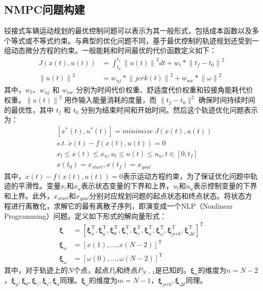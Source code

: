 \documentclass[master,academic]{ysuthesis} %
\begin{document}
		\subsection{NMPC问题构建}
		铰接式车辆运动规划的最优控制问题可以表示为其一般形式，包括成本函数以及多个等式或不等式约束。与典型的优化问题不同，基于最优控制的轨迹规划还受到一组动态微分方程的约束。一般能耗和时间最优的代价函数定义如下：
		\begin{equation}
			\begin{aligned}
				J(x(t),u(t)) &= \int_{t_0}^{t_f}
				\left\| u(t)\right\|^2dt +w_t*\left\|t_f-t_0\right\|^2    \\
				\left\|u(t)\right\|^2&=w_{uj}*\left\|jerk(t)\right\|^2+w_{uw}*\left\|\omega\right\|^2
			\end{aligned} 
		\end{equation}
		其中，$w_t$、$w_{uj}$ 和 $w_{uw}$ 分别为时间代价权重、舒适度代价权重和铰接角能耗代价权重。$\left\|u(t)\right\|^2$ 用作输入能量消耗的度量，而 $\|t_f- t_0\|^2$ 确保时间持续时间的最优性，其中 $t_f$ 和 $t_0$ 分别为结束时间和开始时间。然后这个轨迹优化问题表示为：
		\begin{equation}
			\begin{aligned}
				&\left[x^*(t),u^*(t)\right] = minimize\ J(x(t),u(t))\\      
				&s.t.\ \dot x(t)-f(x(t),u(t))=0\\
				&x_l \leq x(t) \leq x_u, u_l \leq u(t) \leq u_u,t\in \left[0,t_f\right]\\
				&x(t_0)=x_{start},x(t_f)=x_{goal}\label{eq:最优控制优化问题}
			\end{aligned}   
		\end{equation}
		其中，$\dot x(t)-f(x(t),u(t))=0$表示运动方程约束，为了保证优化问题中轨迹的平滑性。变量$x_l$和$x_u$表示状态变量的下界和上界，$u_l$和$u_u$表示控制变量的下界和上界。此外，$x_{start}$和$x_{goal}$分别对应规划问题的起点状态和终点状态。将状态方程进行离散化，求解它的最有离散子序列，即演变成一个NLP（Nonlinear Programming）问题。定义如下形式的解向量形式：
		\begin{equation}
			\begin{aligned}
				\bm{\xi} &=\left[ \bm{\xi} _{x}^{\mathrm{T}},\bm{\xi} _{y}^{\mathrm{T}},\bm{\xi} _{\theta}^{\mathrm{T}},\bm{\xi} _{\gamma}^{\mathrm{T}},\bm{\xi} _{v}^{\mathrm{T}},\bm{\xi} _{a}^{\mathrm{T}},\bm{\xi} _{\omega}^{\mathrm{T}},\bm{\xi}_{{jerk}}^{\mathrm{T}},\bm{\xi} _{\Delta t}^{\mathrm{T}} \right] ^{\mathrm{T}}\\
				\bm{\xi} _x&=\left[ x\left( 1 \right) ,...,x\left( N-2 \right) \right] ^{\mathrm{T}}\\
				\bm{\xi} _{\omega}&=\left[ \omega \left( 0 \right) ,...,\omega \left( N-2 \right) \right] ^{\mathrm{T}}
			\end{aligned}   
		\end{equation}
		其中，对于轨迹上的$N$个点，起点$P_0$和终点$P_{N-1}$是已知的。$\bm{\xi} _{x}$的维度为$n=N-2$，$\bm{\xi} _{y},\bm{\xi} _{\theta},\bm{\xi} _{\gamma},\bm{\xi} _{v},\bm{\xi} _{a}$同理。$\bm{\xi} _{\omega}$的维度为$m=N-1$，$\bm{\xi}_{jerk},\bm{\xi} _{\Delta t}$同理。
\end{document}
